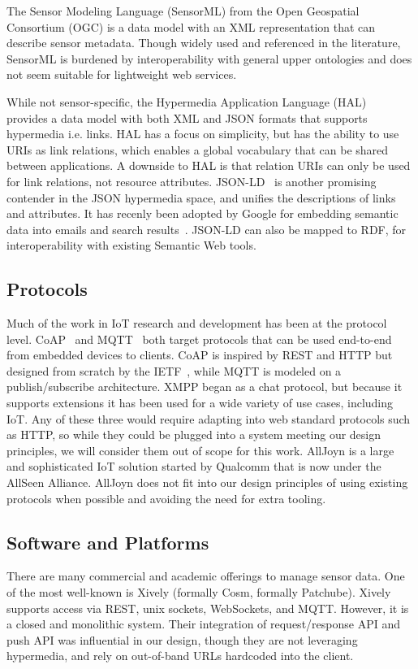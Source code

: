 \documentclass{acm_proc_article-sp}
\begin{document}
The Sensor Modeling Language (SensorML) from the Open Geospatial Consortium
(OGC) is a data model with an XML representation that can describe sensor
metadata. Though widely used and referenced in the literature, SensorML is
burdened by interoperability with general upper ontologies and does not seem
suitable for lightweight web services.

While not sensor-specific, the Hypermedia Application Language
(HAL)~\cite{json-hal-draft} provides a data model with both XML and JSON
formats that supports hypermedia i.e. links. HAL has a focus on simplicity,
but has the ability to use URIs as link relations, which enables a global
vocabulary that can be shared between applications. A downside to HAL is that
relation URIs can only be used for link relations, not resource attributes.
JSON-LD~\cite{json-ld} is another promising contender in the JSON hypermedia
space, and unifies the descriptions of links and attributes. It has recenly
been adopted by Google for embedding semantic data into emails and search
results~\cite{sporny_google}. JSON-LD can also be mapped to RDF, for
interoperability with existing Semantic Web tools.

\subsection{Protocols}
Much of the work in IoT research and development has been at the protocol
level. CoAP~\cite{coap} and MQTT~\cite{mqtt} both target protocols that can be
used end-to-end from embedded devices to clients. CoAP is inspired by REST and
HTTP but designed from scratch by the IETF~\cite{californium}, while MQTT is
modeled on a publish/subscribe architecture. XMPP began as a chat protocol, but
because it supports extensions it has been used for a wide variety of use
cases, including IoT. Any of these three would require adapting into web
standard protocols such as HTTP, so while they could be plugged into a system
meeting our design principles, we will consider them out of scope for this
work. AllJoyn is a large and sophisticated IoT solution started by Qualcomm
that is now under the AllSeen Alliance. AllJoyn does not fit into our design
principles of using existing protocols when possible and avoiding the need for
extra tooling.

\subsection{Software and Platforms}
There are many commercial and academic offerings to manage sensor data. One of
the most well-known is Xively (formally Cosm, formally Patchube). Xively
supports access via REST, unix sockets, WebSockets, and MQTT. However, it is a
closed and monolithic system. Their integration of request/response API and
push API was influential in our design, though they are not leveraging
hypermedia, and rely on out-of-band URLs hardcoded into the client.
\end{document}
